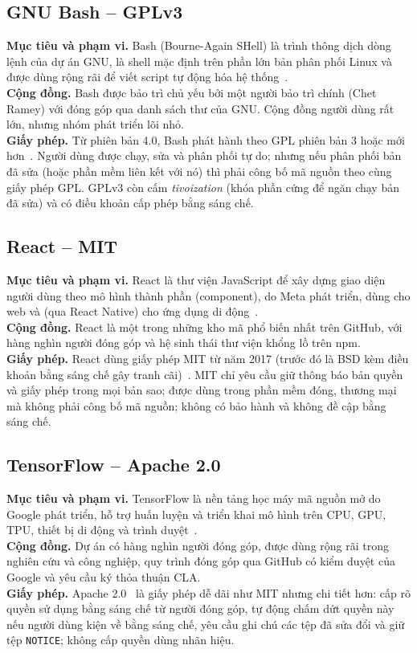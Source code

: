 \documentclass[runningheads]{llncs}
\begin{document}
\subsection{GNU Bash – GPLv3}\label{sec:bash}
\textbf{Mục tiêu và phạm vi.} Bash (Bourne-Again SHell) là trình thông dịch dòng lệnh của
dự án GNU, là shell mặc định trên phần lớn bản phân phối Linux và được dùng rộng rãi để viết
script tự động hóa hệ thống~\cite{bash}.\\
\textbf{Cộng đồng.} Bash được bảo trì chủ yếu bởi một người bảo trì chính (Chet Ramey) với
đóng góp qua danh sách thư của GNU. Cộng đồng người dùng rất lớn, nhưng nhóm phát triển lõi nhỏ.\\
\textbf{Giấy phép.} Từ phiên bản 4.0, Bash phát hành theo GPL phiên bản 3 hoặc mới hơn~\cite{gpl3}.
Người dùng được chạy, sửa và phân phối tự do; nhưng nếu phân phối bản đã sửa (hoặc phần mềm
liên kết với nó) thì phải công bố mã nguồn theo cùng giấy phép GPL. GPLv3 còn cấm \emph{tivoization}
(khóa phần cứng để ngăn chạy bản đã sửa) và có điều khoản cấp phép bằng sáng chế.

\subsection{React – MIT}\label{sec:react}
\textbf{Mục tiêu và phạm vi.} React là thư viện JavaScript để xây dựng giao diện người dùng
theo mô hình thành phần (component), do Meta phát triển, dùng cho web và (qua React Native) cho
ứng dụng di động~\cite{react}.\\
\textbf{Cộng đồng.} React là một trong những kho mã phổ biến nhất trên GitHub, với hàng nghìn
người đóng góp và hệ sinh thái thư viện khổng lồ trên npm.\\
\textbf{Giấy phép.} React dùng giấy phép MIT từ năm 2017 (trước đó là BSD kèm điều khoản bằng
sáng chế gây tranh cãi)~\cite{mit}. MIT chỉ yêu cầu giữ thông báo bản quyền và giấy phép trong
mọi bản sao; được dùng trong phần mềm đóng, thương mại mà không phải công bố mã nguồn; không có
bảo hành và không đề cập bằng sáng chế.

\subsection{TensorFlow – Apache 2.0}\label{sec:tf}
\textbf{Mục tiêu và phạm vi.} TensorFlow là nền tảng học máy mã nguồn mở do Google phát triển,
hỗ trợ huấn luyện và triển khai mô hình trên CPU, GPU, TPU, thiết bị di động và trình duyệt~\cite{tf}.\\
\textbf{Cộng đồng.} Dự án có hàng nghìn người đóng góp, được dùng rộng rãi trong nghiên cứu và
công nghiệp, quy trình đóng góp qua GitHub có kiểm duyệt của Google và yêu cầu ký thỏa thuận CLA.\\
\textbf{Giấy phép.} Apache 2.0~\cite{apache} là giấy phép dễ dãi như MIT nhưng chi tiết hơn: cấp
rõ quyền sử dụng bằng sáng chế từ người đóng góp, tự động chấm dứt quyền này nếu người dùng kiện
về bằng sáng chế, yêu cầu ghi chú các tệp đã sửa đổi và giữ tệp \texttt{NOTICE}; không cấp quyền
dùng nhãn hiệu.
\end{document}
